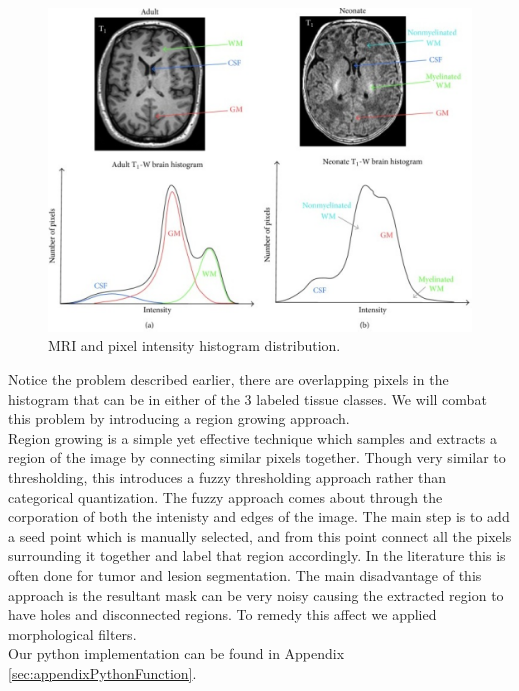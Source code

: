 \begin{figure}[H]
  \centering
  \includegraphics[width=\linewidth]{img/mriHistogram.png}
  \caption{MRI and pixel intensity histogram distribution.}
  \label{fig:mriHistogram}
\end{figure}

Notice the problem described earlier, there are overlapping pixels in the histogram that can be in either of the 3 labeled tissue classes.  We will combat this problem by introducing a region growing approach.\\

Region growing is a simple yet effective technique which samples and extracts a region of the image by connecting similar pixels together. Though very similar to thresholding, this introduces a fuzzy thresholding approach rather than categorical quantization.  The fuzzy approach comes about through the corporation of both the intenisty and edges of the image. The main step is to add a seed point which is manually selected, and from this point connect all the pixels surrounding it together and label that region accordingly.  In the literature this is often done for tumor and lesion segmentation\cite{guliato1998segmentation}. The main disadvantage of this approach is the resultant mask can be very noisy causing the extracted region to have holes and disconnected regions.  To remedy this affect we applied morphological filters\cite{mendiola2007morphological}.\\

Our python implementation can be found in Appendix \ref{sec:appendixPythonFunction}.